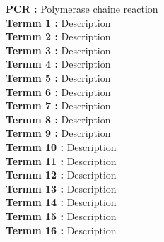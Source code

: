 \textbf{PCR :} Polymerase chaine reaction  \\ 
\textbf{Termm 1  :} Description            \\
\textbf{Termm 2  :} Description            \\
\textbf{Termm 3  :} Description            \\
\textbf{Termm 4  :} Description            \\
\textbf{Termm 5  :} Description            \\
\textbf{Termm 6  :} Description            \\
\textbf{Termm 7  :} Description            \\
\textbf{Termm 8  :} Description            \\
\textbf{Termm 9  :} Description            \\
\textbf{Termm 10 :} Description            \\
\textbf{Termm 11 :} Description            \\
\textbf{Termm 12 :} Description            \\
\textbf{Termm 13 :} Description            \\
\textbf{Termm 14 :} Description            \\
\textbf{Termm 15 :} Description            \\
\hspace{8mm}
\textbf{Termm 16 :} Description            \\
\hspace{8mm}
